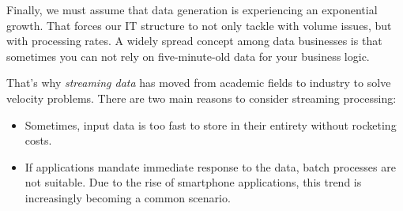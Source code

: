 Finally, we must assume that data generation is experiencing an exponential growth. That forces our IT structure to not only tackle with volume issues, but with processing rates. A widely spread concept among data businesses is that sometimes you can not rely on five-minute-old data for your business logic.

That's why \textit{streaming data} has moved from academic fields to industry to solve velocity problems. There are two main reasons to consider streaming processing:
\begin{itemize}
	\item Sometimes, input data is too fast to store in their entirety without rocketing costs.
	\item If applications mandate immediate response to the data, batch processes are not suitable. Due to the rise of smartphone applications, this trend is increasingly becoming a common scenario.
\end{itemize}